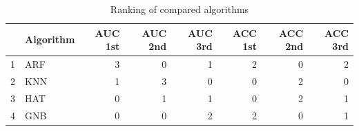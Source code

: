 \begin{table}
\footnotesize
\caption{Ranking of compared algorithms}
\label{tab:places}
\begin{tabular}{llrrrrrr}
\hline
 & Algorithm & AUC 1st & AUC 2nd & AUC 3rd & ACC 1st & ACC 2nd & ACC 3rd \\
\hline
1 & ARF & 3 & 0 & 1 & 2 & 0 & 2 \\
2 & KNN & 1 & 3 & 0 & 0 & 2 & 0 \\
3 & HAT & 0 & 1 & 1 & 0 & 2 & 1 \\
4 & GNB & 0 & 0 & 2 & 2 & 0 & 1 \\
\hline
\end{tabular}
\end{table}
